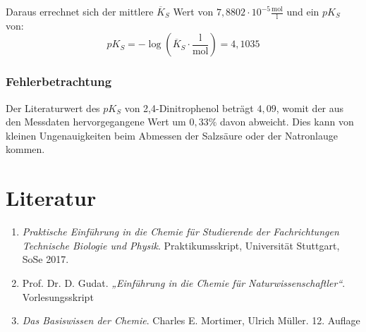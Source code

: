 \documentclass{scrartcl}
\begin{document}
Daraus errechnet sich der mittlere $\overline{K}_S$ Wert von $7,8802\cdot 10^{-5} \frac{\text{mol}}{\text{l}}$ und ein $pK_S$ von:
\begin{equation}
	pK_S = -\log{(\overline{K}_S\cdot\frac{\text{l}}{\text{mol}})} = 4,1035
\end{equation}

\subsubsection{Fehlerbetrachtung}
Der Literaturwert des $pK_S$ von 2,4-Dinitrophenol beträgt $4,09$, womit der aus den Messdaten hervorgegangene Wert um $0,33\%$ davon abweicht. Dies kann von kleinen Ungenauigkeiten beim Abmessen der Salzsäure oder der Natronlauge kommen. 
\section{Literatur}
\begin{enumerate}[label=(\arabic*)]
	\item \emph{Praktische Einführung in die Chemie
für Studierende der Fachrichtungen
Technische Biologie und Physik}. Praktikumsskript, Universität Stuttgart,
SoSe 2017.  
	\item Prof. Dr. D. Gudat. \emph{„Einführung in die Chemie für Naturwissenschaftler“}. Vorlesungsskript
	\item \emph{Das Basiswissen der Chemie}. Charles E. Mortimer, Ulrich Müller. 12. Auflage
\end{enumerate}
\end{document}
